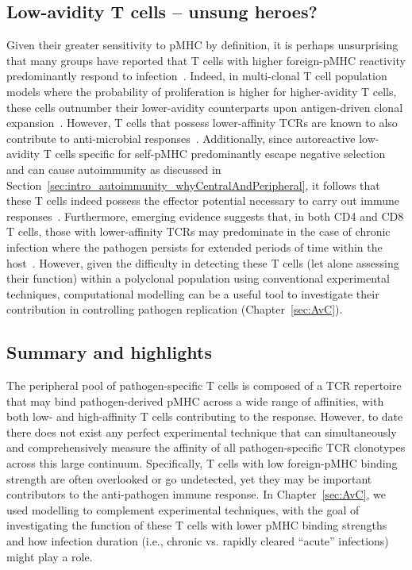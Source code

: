 \subsection{Low-avidity T cells -- unsung heroes?}
\label{sec:intro_affinity_highVsLowAffinity}

Given their greater sensitivity to pMHC by definition, it is perhaps unsurprising that many groups have reported that T cells with higher foreign-pMHC reactivity predominantly respond to infection~\cite{busch1999t,king2012t,rosenthal2012low,mandl2013t,straub2023recruitment}. Indeed, in multi-clonal T cell population models where the probability of proliferation is higher for higher-avidity T cells, these cells outnumber their lower-avidity counterparts upon antigen-driven clonal expansion~\cite{de1994t,de1995towards,chao2004stochastic,chao2004modelling}. However, T cells that possess lower-affinity TCRs are known to also contribute to anti-microbial responses~\cite{martinez2015lower,martinez2016low,kolawole2020relationship}. Additionally, since autoreactive low-avidity T cells specific for self-pMHC predominantly escape negative selection and can cause autoimmunity as discussed in Section~\ref{sec:intro_autoimmunity_whyCentralAndPeripheral}, it follows that these T cells indeed possess the effector potential necessary to carry out immune responses~\cite{kolawole2020relationship}. Furthermore, emerging evidence suggests that, in both CD4\pos{} and CD8\pos{} T cells, those with lower-affinity TCRs may predominate in the case of chronic infection where the pathogen persists for extended periods of time within the host~\cite{gallegos2016control,tsitsiklis2020unusual,schober2020reverse}. However, given the difficulty in detecting these T cells (let alone assessing their function) within a polyclonal population using conventional experimental techniques, computational modelling can be a useful tool to investigate their contribution in controlling pathogen replication (Chapter~\ref{sec:AvC}). 

\subsection{Summary and highlights}
The peripheral pool of pathogen-specific T cells is composed of a TCR repertoire that may bind pathogen-derived pMHC across a wide range of affinities, with both low- and high-affinity T cells contributing to the response. However, to date there does not exist any perfect experimental technique that can simultaneously and comprehensively measure the affinity of all pathogen-specific TCR clonotypes across this large continuum. Specifically, T cells with low foreign-pMHC binding strength are often overlooked or go undetected, yet they may be important contributors to the anti-pathogen immune response. In Chapter~\ref{sec:AvC}, we used modelling to complement experimental techniques, with the goal of investigating the function of these T cells with lower pMHC binding strengths and how infection duration (i.e., chronic vs. rapidly cleared ``acute'' infections) might play a role.

